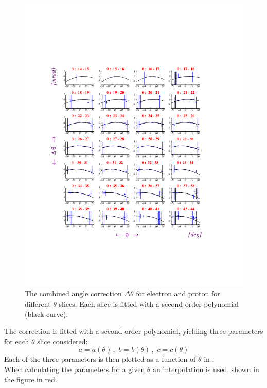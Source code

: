 \begin{figure}
 \begin{center}
 \includegraphics[width = 15cm, bb=60 120 540 650]{data_reduction/kine_corr/img/PHA}
  \caption[The combined angle correction for electron and proton for different $\theta$ slices]
          { The combined angle correction $\Delta\theta$ for electron and proton for 
                different $\theta$ slices. Each slice is fitted with a second order polynomial (black curve).}
 \label{fig:correction}
 \end{center}
\end{figure}
\cia
The correction is fitted with a second order polynomial, yielding three parameters for each $\theta$ slice considered:
$$
a = a(\theta)\, , \,\, 
b = b(\theta)\, , \,\,  
c = c(\theta)
$$
Each of the three parameters is then plotted as a function of $\theta$ in .\\
When calculating the parameters for a given $\theta$ an interpolation is used, shown in the figure in red.
